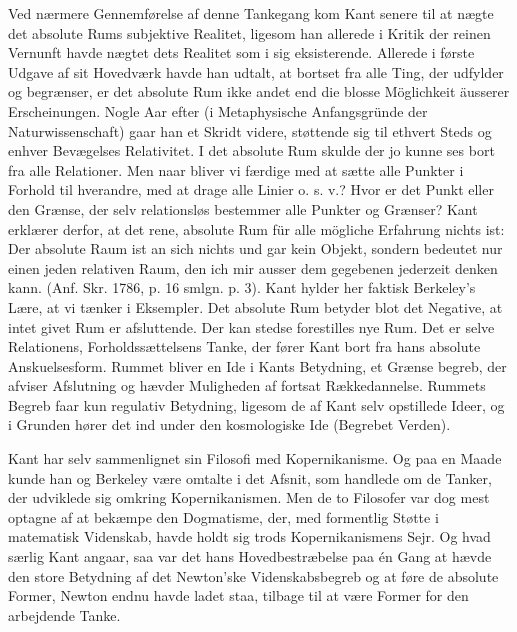 \documentclass[12pt]{article}
\newcommand{\opage}[1]{\marginnote{\footnotesize\textit{[#1]}}}
\begin{document}
Ved nærmere Gennemførelse af denne Tankegang kom Kant senere til at nægte det
absolute Rums subjektive Realitet, ligesom han allerede i \guillemotright Kritik
der reinen Vernunft\guillemotleft{} havde nægtet dets Realitet som i sig
eksisterende. Allerede i første Udgave af sit Hovedværk havde han udtalt, at
bortset fra alle Ting, der udfylder og begrænser, er det absolute Rum ikke
andet end \guillemotright die blosse Möglichkeit äusserer
Erscheinungen\guillemotleft. Nogle Aar efter (i \guillemotright Metaphysische
Anfangsgründe der Naturwissenschaft\guillemotleft) gaar han et Skridt videre,
støttende sig til ethvert Steds og enhver Bevægelses Relativitet. I det
absolute Rum skulde der jo kunne ses bort fra alle Relationer. Men naar bliver
vi færdige med at sætte alle Punkter i Forhold til hverandre, med at drage
alle Linier o. s. v.? Hvor er det Punkt eller den Grænse, der selv
relationsløs bestemmer alle Punkter og Grænser? Kant erklærer derfor, at det
rene, absolute Rum \guillemotright für alle mögliche Erfahrung nichts
ist\guillemotleft: \guillemotright Der absolute Raum ist an sich nichts und
gar kein Objekt, sondern bedeutet nur einen jeden relativen Raum, den ich mir
ausser dem gegebenen jederzeit denken kann.\guillemotleft{} (Anf. Skr. 1786,
p. 16 smlgn. p. 3). Kant hylder her faktisk Berkeley's Lære, at vi tænker i
Eksempler. Det absolute Rum betyder blot det Negative, at intet givet Rum er
afsluttende. Der kan stedse forestilles nye Rum. Det er selve Relationens,
Forholdssættelsens Tanke, der fører Kant bort fra hans absolute
Anskuelsesform. Rummet bliver en \guillemotright Ide\guillemotleft{} i Kants
Betydning, et Grænse%
\opage{71}begreb, der afviser Afslutning og hævder Muligheden af fortsat Rækkedannelse.
Rummets Begreb faar kun regulativ Betydning, ligesom de af Kant selv opstillede
\guillemotright Ideer\guillemotleft, og i Grunden hører det ind under
\guillemotright den kosmologiske Ide\guillemotleft{} (Begrebet Verden).

Kant har selv sammenlignet sin Filosofi med Kopernikanisme. Og paa en Maade
kunde han og Berkeley være omtalte i det Afsnit, som handlede om de Tanker,
der udviklede sig \guillemotright omkring Kopernikanismen\guillemotleft. Men
de to Filosofer var dog mest optagne af at bekæmpe den Dogmatisme, der, med
formentlig Støtte i matematisk Videnskab, havde holdt sig trods
Kopernikanismens Sejr. Og hvad særlig Kant angaar, saa var det hans
Hovedbestræbelse paa én Gang at hævde den store Betydning af det Newton'ske
Videnskabsbegreb og at føre de absolute Former, Newton endnu havde ladet staa,
tilbage til at være Former for den arbejdende Tanke.
\end{document}
